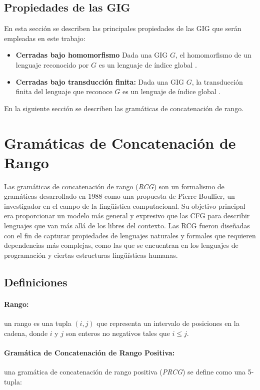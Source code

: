 \subsection{Propiedades de las GIG}

En esta sección se describen las principales propiedades de las GIG que serán empleadas en este trabajo:
\begin{itemize}
      \item  \textbf{Cerradas bajo homomorfismo} Dada una GIG $G$, el homomorfismo de un lenguaje reconocido por $G$ es un lenguaje de índice global \cite{globalIndexLanguages}.
      \item  \textbf{Cerradas bajo transducción finita:} Dada una GIG $G$, la transducción finita del lenguaje que reconoce $G$ es un lenguaje de índice global \cite{globalIndexLanguages}.
\end{itemize}

En la siguiente sección se describen las gramáticas de concatenación de rango.

\section{Gramáticas de Concatenación de Rango}

Las gramáticas de concatenación de rango (\textit{RCG}) \cite{mainRCGBib} son un formalismo de gramáticas desarrollado
en 1988 como una propuesta de Pierre Boullier, un investigador en el campo de la lingüística
computacional. Su objetivo principal era proporcionar un modelo más general y expresivo que las CFG para describir
lenguajes que van más allá de los libres del contexto. Las RCG fueron diseñadas con el fin de capturar propiedades
de lenguajes naturales y formales que requieren dependencias más complejas, como las que se encuentran en los
lenguajes de programación y ciertas estructuras lingüísticas humanas.

\subsection{Definiciones}

\paragraph{Rango:} un rango es una tupla $(i, j)$ que representa un intervalo de posiciones en la cadena, donde $i$ y $j$ son enteros no negativos tales que $i \leq j$.

\paragraph{Gramática de Concatenación de Rango Positiva:} una gramática de concatenación de rango positiva (\textit{PRCG}) se define como una 5-tupla:

